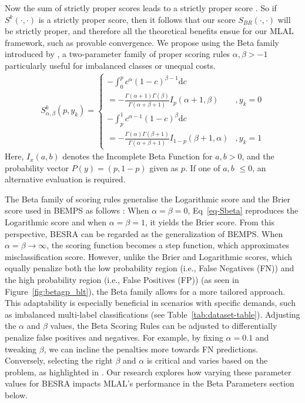 \documentclass[letterpaper]{article} %
\begin{document}
Now the sum of strictly proper scores leads to a strictly proper score \cite{dawid2014theory}.  So if $S^k(\cdot,\cdot)$ is a strictly proper score, then it follows that our  score $S_{BR}(\cdot,\cdot)$ will be strictly proper, and therefore all the theoretical benefits ensue for our MLAL framework, such as provable convergence.
We propose using the Beta family introduced by \cite{Buja2005Loss}, a two-parameter family of proper scoring rules
$\alpha,\beta > -1$ particularly useful for imbalanced classes or unequal costs.
{\scriptsize
\begin{eqnarray}
\label{eq-Sbeta}
S^k_{\alpha,\beta}(p,y_k) = \left\{
\begin{array}{lr}
- \int_0^p c^\alpha (1-c)^{\beta-1} \mbox{d}c  \\ =
- \frac{\Gamma(\alpha+1)\Gamma(\beta)}{\Gamma(\alpha+\beta+1)} I_p(\alpha+1,\beta)
& , y_k=0\\
- \int_p^1 c^{\alpha-1} (1-c)^{\beta} \mbox{d}c \\
=
- \frac{\Gamma(\alpha)\Gamma(\beta+1)}{\Gamma(\alpha+\beta+1)} I_{1-p}(\beta+1,\alpha) & ,y_k=1
\end{array} \right.
\end{eqnarray}}
\noindent
Here, $I_x(a,b)$ denotes the Incomplete Beta Function for $a,b>0$,
and the probability vector $P(y)=(p, 1-p)$ given as $p$.
If one of $a,b$ $\le 0$, an alternative evaluation is required.

The Beta family of scoring rules generalise the Logarithmic score and the Brier score used in BEMPS as follows \cite{merkle2013choosing}:
When $\alpha=\beta=0$, Eq~\eqref{eq-Sbeta} reproduces the Logarithmic score
and when $\alpha=\beta=1$, it yields the Brier score.
From this perspective, BESRA can be regarded as the generalization of BEMPS.
When $\alpha = \beta \rightarrow \infty$, the scoring function becomes a step function, which approximates misclassification score.
However, unlike the Brier and Logarithmic scores, which equally penalize both the low probability region (i.e., False Negatives (FN)) and the high probability region (i.e., False Positives (FP)) (as seen in Figure~\ref{fig:betagp_blt}), the Beta family allows for a more tailored approach.
This adaptability is especially beneficial in scenarios with specific demands, such as imbalanced multi-label classifications (see Table~\ref{tab:dataset-table}).
Adjusting the $\alpha$ and $\beta$ values, the Beta Scoring Rules can be adjusted to differentially penalize false positives and negatives.
For example, by fixing $\alpha=0.1$ and tweaking $\beta$, we can incline the penalties more towards FN predictions.
Conversely, selecting the right $\beta$ and $\alpha$ is critical and varies based on the problem, as highlighted in \citep{merkle2013choosing, doi:10.1198/016214506000001437}. Our research explores how varying these parameter values for BESRA impacts MLAL's performance in the Beta Parameters section below.
\end{document}
